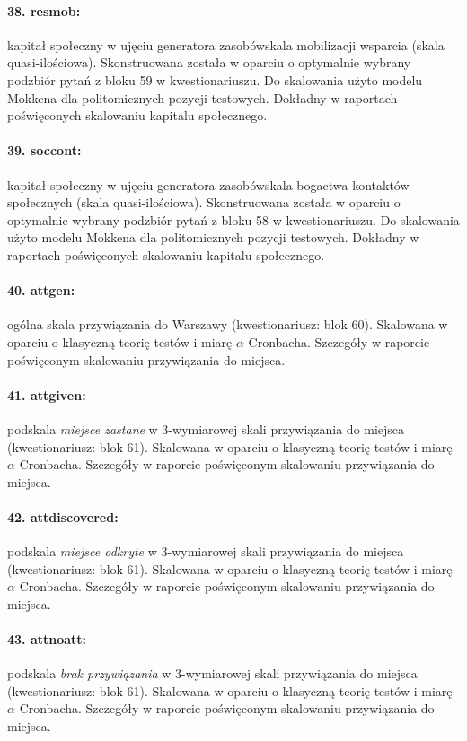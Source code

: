 \documentclass[10pt, a4paper]{article}
\begin{document}
\paragraph{38. resmob:} kapitał społeczny w ujęciu generatora zasobów\textemdash skala mobilizacji wsparcia (skala quasi-ilościowa). Skonstruowana została w oparciu o optymalnie wybrany podzbiór pytań z bloku 59 w kwestionariuszu. Do skalowania użyto modelu Mokkena dla politomicznych pozycji testowych. Dokładny w raportach poświęconych skalowaniu kapitalu społecznego.
\paragraph{39. soccont:} kapitał społeczny w ujęciu generatora zasobów\textemdash skala bogactwa kontaktów społecznych (skala quasi-ilościowa). Skonstruowana została w oparciu o optymalnie wybrany podzbiór pytań z bloku 58 w kwestionariuszu. Do skalowania użyto modelu Mokkena dla politomicznych pozycji testowych. Dokładny w raportach poświęconych skalowaniu kapitalu społecznego.
\paragraph{40. attgen:} ogólna skala przywiązania do Warszawy (kwestionariusz: blok 60). Skalowana w oparciu o klasyczną teorię testów i miarę $\alpha$-Cronbacha. Szczegóły w raporcie poświęconym skalowaniu przywiązania do miejsca.
\paragraph{41. attgiven:} podskala {\it miejsce zastane} w 3-wymiarowej skali przywiązania do miejsca (kwestionariusz: blok 61). Skalowana w oparciu o klasyczną teorię testów i miarę $\alpha$-Cronbacha. Szczegóły w raporcie poświęconym skalowaniu przywiązania do miejsca.
\paragraph{42. attdiscovered:} podskala {\it miejsce odkryte} w 3-wymiarowej skali przywiązania do miejsca (kwestionariusz: blok 61). Skalowana w oparciu o klasyczną teorię testów i miarę $\alpha$-Cronbacha. Szczegóły w raporcie poświęconym skalowaniu przywiązania do miejsca.
\paragraph{43. attnoatt:} podskala {\it brak przywiązania} w 3-wymiarowej skali przywiązania do miejsca (kwestionariusz: blok 61). Skalowana w oparciu o klasyczną teorię testów i miarę $\alpha$-Cronbacha. Szczegóły w raporcie poświęconym skalowaniu przywiązania do miejsca.
\end{document}
